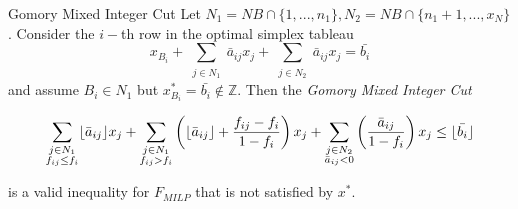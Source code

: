 \begin{frame}{Gomory Mixed Integer Cut}
Let $N_1= NB \cap \{1,...,n_1\}, N_2 = NB \cap \{n_1+1,...,x_N\}$. Consider the $i-$th row in the optimal simplex tableau
\begin{equation*}
    x_{B_i} + \sum\limits_{\substack{j \in N_1}} \bar{a}_{ij} x_j + \sum\limits_{\substack{j \in N_2}} \bar{a}_{ij} x_j = \bar{b_i}
\end{equation*}
and assume $B_i \in N_1$ but $x_{B_i}^*=\bar{b_i} \notin \mathbb{Z}$. Then the \emph{Gomory Mixed Integer Cut}
\begin{tcolorbox}[colback=white]
\begin{equation*}
\sum\limits_{\substack{j \in N_1 \\ f_{ij} \leq f_i}} \lfloor\bar{a}_{ij}\rfloor x_j + \sum\limits_{\substack{j \in N_1 \\ f_{ij} > f_i}} \left( \lfloor\bar{a}_{ij}\rfloor + \frac{f_{ij}-f_i}{1-f_i} \right) x_j + \sum\limits_{\substack{j \in N_2 \\ \bar{a}_{ij} < 0}} \left( \frac{\bar{a}_{ij}}{1-f_i} \right) x_j \leq \lfloor\bar{b_i}\rfloor
\end{equation*}
\end{tcolorbox}

is a valid inequality for $F_{MILP}$ that is not satisfied by $x^*$.
\end{frame}
